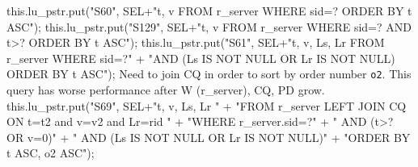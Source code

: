 \documentclass{article}
\def\nwendcode{\endtrivlist \endgroup}      %
\theoremstyle{definition}                   %
\begin{document}
this.lu_pstr.put("S60", SEL+"t, v FROM r_server WHERE sid=? ORDER BY t ASC");
\eatline
{}\nwendcode{}\endmoddef{}
this.lu_pstr.put("S129", SEL+"t, v FROM r_server WHERE sid=? AND t>? ORDER BY t ASC");
\eatline
{}\nwendcode{}\endmoddef{}
this.lu_pstr.put("S61", SEL+"t, v, Ls, Lr FROM r_server WHERE sid=?"
      + "AND (Ls IS NOT NULL OR Lr IS NOT NULL) ORDER BY t ASC");
\eatline
{}\nwendcode{}Need to join CQ in order to sort by order number {\tt{}o2}. This query has
worse performance after W (r\_server), CQ, PD grow.
\nwenddocs{}\endmoddef{}
this.lu_pstr.put("S69", SEL+"t, v, Ls, Lr "
      + "FROM r_server LEFT JOIN CQ ON t=t2 and v=v2 and Lr=rid "
      + "WHERE r_server.sid=?"
      + "   AND (t>? OR v=0)"
      + "   AND (Ls IS NOT NULL OR Lr IS NOT NULL)"
      + "ORDER BY t ASC, o2 ASC");
\eatline
{}\nwendcode{}\endmoddef{}
\end{document}
